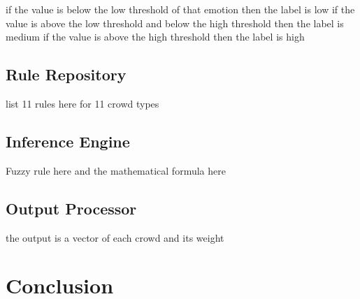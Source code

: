 if the value is below the low threshold of that emotion then the label is low
if the value is above the low threshold and below the high threshold then the label is medium
if the value is above the high threshold then the label is high

\subsection{Rule Repository}

list 11 rules here for 11 crowd types

\subsection{Inference Engine}

Fuzzy rule here and the mathematical formula here

\subsection{Output Processor}

the output is a vector of each crowd and its weight

\section{Conclusion}